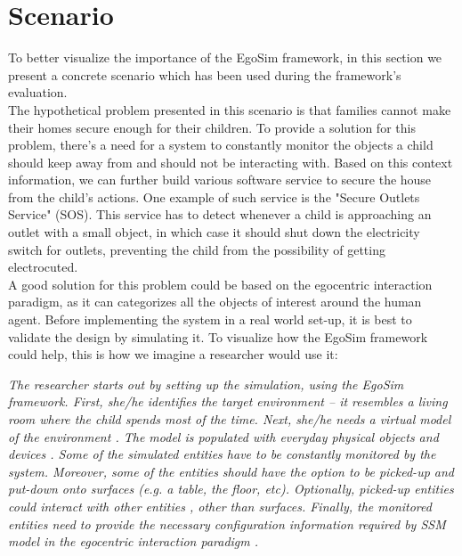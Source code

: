 \section{Scenario} %
\label{sec:scenario}
To better visualize the importance of the EgoSim framework, in this section we present a concrete scenario which has been used during the framework's evaluation.\\

The hypothetical problem presented in this scenario is that families cannot make their homes secure enough for their children. To provide a solution for this problem, there's a need for a system to constantly monitor the objects a child should keep away from and should not be interacting with. Based on this context information, we can further build various software service to secure the house from the child's actions. One example of such service is the "Secure Outlets Service" (SOS). This service has to detect whenever a child is approaching an outlet with a small object, in which case it should shut down the electricity switch for outlets, preventing the child from the possibility of getting electrocuted.\\

A good solution for this problem could be based on the egocentric interaction paradigm, as it can categorizes all the objects of interest around the human agent. Before implementing the system in a real world set-up, it is best to validate the design by simulating it. To visualize how the EgoSim framework could help, this is how we imagine a researcher would use it:

\begin{flushright}{\slshape
The researcher starts out by setting up the simulation, using the EgoSim framework. First, she/he identifies the target environment -- it resembles a living room where the child spends most of the time. Next, she/he 
needs a virtual model of the environment . The model is populated  with everyday physical objects  and devices . Some of the simulated entities have to be constantly monitored  by the system. Moreover, some of the entities should have the option to be picked-up  and put-down  onto surfaces  (e.g. a table, the floor, etc). Optionally, picked-up entities could interact with other entities , other than surfaces. Finally, the monitored entities need to provide the necessary configuration information required by SSM model in the egocentric interaction paradigm .
} \\ \medskip
\end{flushright}

